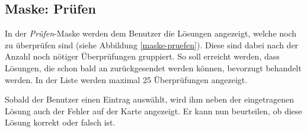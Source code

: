 \subsection{Maske: Prüfen}
In der \emph{Prüfen}-Maske werden dem Benutzer die Lösungen angezeigt, welche noch zu überprüfen sind (siehe Abbildung \ref{maske-pruefen}).
Diese sind dabei nach der Anzahl noch nötiger Überprüfungen gruppiert.
So soll erreicht werden, dass Lösungen, die schon bald an  zurückgesendet werden können, bevorzugt behandelt werden.
In der Liste werden maximal 25 Überprüfungen angezeigt.

Sobald der Benutzer einen Eintrag auswählt, wird ihm neben der eingetragenen Lösung auch der Fehler auf der Karte angezeigt.
Er kann nun beurteilen, ob diese Lösung korrekt oder falsch ist.

\begin{figure}[H]
\hfill
{}

\end{figure}
